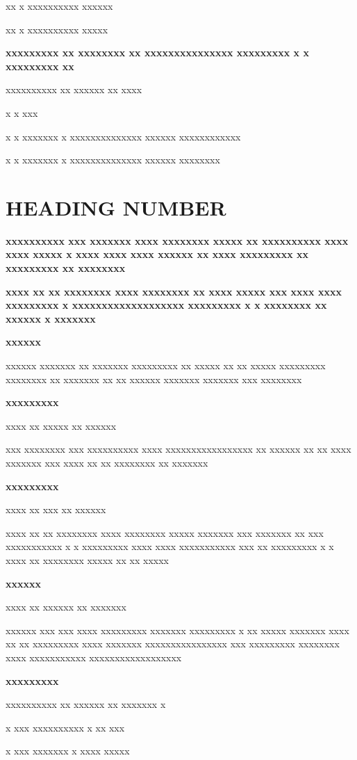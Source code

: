 \documentclass[11pt,a4paper]{article}
\begin{document}
xx x xxxxxxxxxx xxxxxx

xx x xxxxxxxxxx xxxxx

\textbf{xxxxxxxxx		xx xxxxxxxx xx xxxxxxxxxxxxxxx xxxxxxxxx x x xxxxxxxxx xx}

xxxxxxxxxx xx xxxxxx xx xxxx

x x xxx

x  x xxxxxxx x xxxxxxxxxxxxxx xxxxxx xxxxxxxxxxxx

x x xxxxxxx x xxxxxxxxxxxxxx xxxxxx xxxxxxxx

\section{HEADING NUMBER}

\textbf{xxxxxxxxxx xxx xxxxxxx xxxx xxxxxxxx xxxxx xx xxxxxxxxxx xxxx xxxx xxxxx x xxxx xxxx xxxx xxxxxx xx xxxx xxxxxxxxx xx xxxxxxxxx xx xxxxxxxx}

\textbf{xxxx xx xx xxxxxxxx xxxx xxxxxxxx xx xxxx xxxxx xxx xxxx xxxx xxxxxxxxx x xxxxxxxxxxxxxxxxxxx xxxxxxxxx x x xxxxxxxx xx xxxxxx x xxxxxxx}

\textbf{xxxxxx}

xxxxxx xxxxxxx xx xxxxxxx xxxxxxxxx xx xxxxx xx xx xxxxx xxxxxxxxx xxxxxxxx xx xxxxxxx xx xx xxxxxx xxxxxxx xxxxxxx xxx xxxxxxxx

\textbf{xxxxxxxxx}

xxxx xx xxxxx xx xxxxxx

xxx xxxxxxxx xxx xxxxxxxxxx xxxx xxxxxxxxxxxxxxxxx xx xxxxxx xx xx xxxx xxxxxxx xxx xxxx xx xx xxxxxxxx xx xxxxxxx

\textbf{xxxxxxxxx}

xxxx xx xxx xx xxxxxx

xxxx xx xx xxxxxxxx xxxx xxxxxxxx xxxxx xxxxxxx xxx xxxxxxx xx xxx xxxxxxxxxxx x x xxxxxxxxx xxxx xxxx xxxxxxxxxxx xxx xx xxxxxxxxx x x xxxx xx xxxxxxxx xxxxx xx xx xxxxx

\textbf{xxxxxx}

xxxx xx xxxxxx xx xxxxxxx

xxxxxx xxx xxx xxxx xxxxxxxxx xxxxxxx xxxxxxxxx x xx xxxxx xxxxxxx xxxx xx xx xxxxxxxxx xxxx xxxxxxx xxxxxxxxxxxxxxxx xxx xxxxxxxxx xxxxxxxx xxxx xxxxxxxxxxx xxxxxxxxxxxxxxxxxx

\textbf{xxxxxxxxx}

xxxxxxxxxx xx xxxxxx xx xxxxxxx x

x xxx xxxxxxxxxx               x xx xxx

x xxx xxxxxxx                     x xxxx xxxxx
\end{document}
